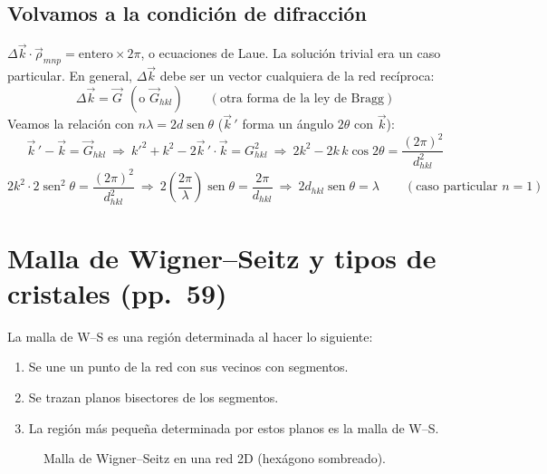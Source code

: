 \documentclass[11pt,a4paper]{article}
\newcommand{\pags}[1]{{\normalfont\small\color{gris}(pp.~#1)}}
\DeclareMathOperator{\sen}{sen}
\begin{document}
\subsection{Volvamos a la condición de difracción}
$\Delta\vec k\cdot\vec\rho_{mnp}=\text{entero}\times2\pi$, o ecuaciones de Laue. La solución trivial era un caso particular.
En general, $\Delta\vec k$ debe ser un vector cualquiera de la red recíproca:
\[
\boxed{\Delta\vec k=\vec G}\ \ (\text{o }\vec G_{hkl})\qquad(\text{otra forma de la ley de Bragg})
\]
Veamos la relación con $n\lambda=2d\sen\theta$ ($\vec k\,'$ forma un ángulo $2\theta$ con $\vec k$):
\[
\vec k\,'-\vec k=\vec G_{hkl}\ \Rightarrow\ k'^2+k^2-2\vec k\,'\cdot\vec k=G_{hkl}^2\ \Rightarrow\
2k^2-2k\,k\cos2\theta=\frac{(2\pi)^2}{d_{hkl}^2}
\]
\[
2k^2\cdot2\sen^2\theta=\frac{(2\pi)^2}{d_{hkl}^2}\ \Rightarrow\
2\left(\frac{2\pi}{\lambda}\right)\sen\theta=\frac{2\pi}{d_{hkl}}\ \Rightarrow\
2d_{hkl}\sen\theta=\lambda\qquad(\text{caso particular }n=1)
\]

\section{Malla de Wigner--Seitz y tipos de cristales \pags{59}}

La malla de W--S es una región determinada al hacer lo siguiente:
\begin{enumerate}
  \item Se une un punto de la red con sus vecinos con segmentos.
  \item Se trazan planos bisectores de los segmentos.
  \item La región más pequeña determinada por estos planos es la malla de W--S.
\end{enumerate}

\begin{figure}[H]
\centering
{}
\caption{Malla de Wigner--Seitz en una red 2D (hexágono sombreado).}
\end{figure}
\end{document}
